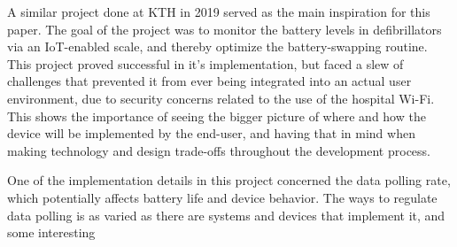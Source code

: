 A similar project done at KTH in 2019 served as the main inspiration for this paper.\cite{hospital} The goal of the project was to monitor the battery levels in defibrillators via an IoT-enabled scale, and thereby optimize the battery-swapping routine. This project proved successful in it's implementation, but faced a slew of challenges that prevented it from ever being integrated into an actual user environment, due to security concerns related to the use of the hospital Wi-Fi. This shows the importance of seeing the bigger picture of where and how the device will be implemented by the end-user, and having that in mind when making technology and design trade-offs throughout the development process.

One of the implementation details in this project concerned the data polling rate, which potentially affects battery life and device behavior. The ways to regulate data polling is as varied as there are systems and devices that implement it, and some interesting 

